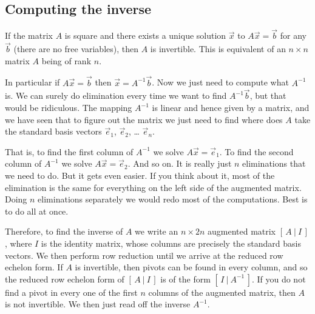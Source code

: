 \subsection{Computing the inverse}

If the matrix $A$ is square and there exists a unique solution
$\vec{x}$ to $A \vec{x} = \vec{b}$ for any $\vec{b}$ (there are no free
variables), then $A$ is invertible.
This is equivalent of an $n \times n$ matrix $A$ being of rank $n$.

In particular if $A \vec{x} = \vec{b}$ then $\vec{x} = A^{-1} \vec{b}$.
Now we just need to compute what $A^{-1}$ is.  We can surely 
do elimination every time we want to find $A^{-1} \vec{b}$, but that
would be ridiculous.  The mapping $A^{-1}$ is linear and
hence given by a matrix, and we have seen that to figure out the matrix
we just need to find where does $A$ take the standard basis vectors
$\vec{e}_1$, 
$\vec{e}_2$, \ldots
$\vec{e}_n$.

That is, to find the first column of $A^{-1}$ we solve
$A \vec{x} = \vec{e}_1$.
To find the second column of $A^{-1}$ we solve
$A \vec{x} = \vec{e}_2$.  And so on.  It is really just $n$
eliminations that we need to do.  But it gets even easier.
If you think about it, most of the elimination is the same for
everything on the left side of the augmented matrix.  Doing
$n$ eliminations separately we would redo most of the computations.
Best is to do all at once.

Therefore, to find the inverse of $A$ we write an $n
\times 2n$ augmented matrix $[ \,A ~|~ I\, ]$, where $I$ is the identity
matrix, whose columns are precisely the standard basis vectors.
We then perform row reduction until we arrive at the reduced row echelon
form.  If $A$ is invertible, then pivots can be found in every column,
and so the 
reduced row echelon form of $[ \,A ~|~ I\, ]$ 
is of the form $[ \,I ~|~ A^{-1}\, ]$.  If you do not find a pivot in every
one of the first $n$ columns of the augmented matrix, then 
$A$ is not invertible.  We then just read off the inverse $A^{-1}$.

